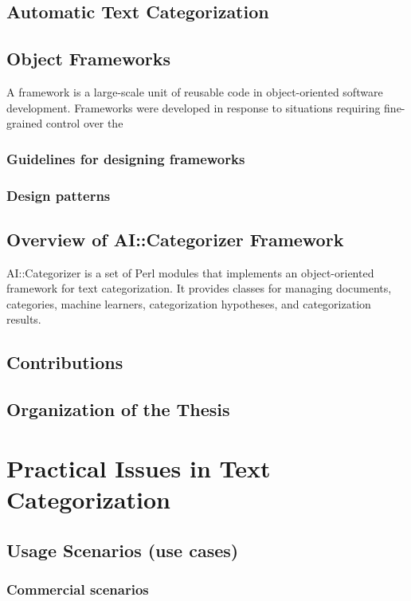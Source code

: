 \documentclass[a4paper]{report}
\begin{document}
\section{Automatic Text Categorization}

\section{Object Frameworks}

A framework is a large-scale unit of reusable code in object-oriented
software development.  Frameworks were developed in response to
situations requiring fine-grained control over the

\subsection{Guidelines for designing frameworks}
\subsection{Design patterns}


\section{Overview of AI::Categorizer Framework}

AI::Categorizer is a set of Perl modules that implements an
object-oriented framework for text categorization.  It provides
classes for managing documents, categories, machine learners,
categorization hypotheses, and categorization results.

\section{Contributions}

\section{Organization of the Thesis}

\chapter{Practical Issues in Text Categorization}

\section{Usage Scenarios (use cases)}
\subsection{Commercial scenarios}
\end{document}
